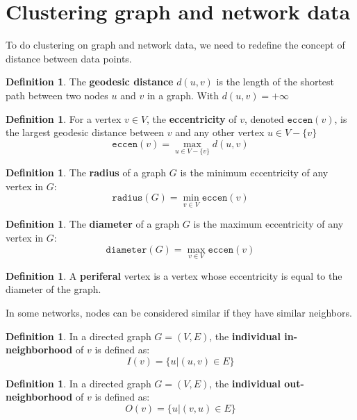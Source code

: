 \documentclass[12pt, openany]{report}
\theoremstyle{definition}
\newtheorem{definition}[thm]{Definition}
\begin{document}
\section{Clustering graph and network data}
To do clustering on graph and network data, we need to redefine the concept of distance between data points.
\begin{definition}
    The \textbf{geodesic distance} $d(u, v)$ is the length of the shortest path between two nodes $u$ and $v$ in a graph. With $d(u,v) = +\infty$
\end{definition}
\begin{definition}
    For a vertex $v \in V$, the \textbf{eccentricity} of $v$, denoted $\texttt{eccen}(v)$, is the largest geodesic distance between $v$ and any other vertex $u \in V - \{v \}$
    \begin{equation}
        \texttt{eccen}(v) = \max_{u \in V - \{v\}} d(u, v)
    \end{equation}
\end{definition}
\begin{definition}
    The \textbf{radius} of a graph $G$ is the minimum eccentricity of any vertex in $G$:
    \begin{equation}
        \texttt{radius}(G) = \min_{v \in V} \texttt{eccen}(v)
    \end{equation}  
\end{definition}
\begin{definition}
        The \textbf{diameter} of a graph $G$ is the maximum eccentricity of any vertex in $G$:
    \begin{equation}
    \texttt{diameter}(G) = \max_{v \in V}\texttt{eccen}(v)
    \end{equation}
\end{definition}
\begin{definition}
    A \textbf{periferal} vertex is a vertex whose eccentricity is equal to the diameter of the graph.
\end{definition}
In some networks, nodes can be considered similar if they have similar neighbors.
\begin{definition}
    In a directed graph $G = (V , E )$, the \textbf{individual in-neighborhood} of $v$ is defined as:
    \begin{equation}
        I(v) = \{u | (u, v) \in E\}
    \end{equation}
\end{definition}
\begin{definition}
    In a directed graph $G = (V , E )$, the \textbf{individual out-neighborhood} of $v$ is defined as:
    \begin{equation}
        O(v) = \{u | (v, u) \in E\}
    \end{equation}
\end{definition}
\end{document}
